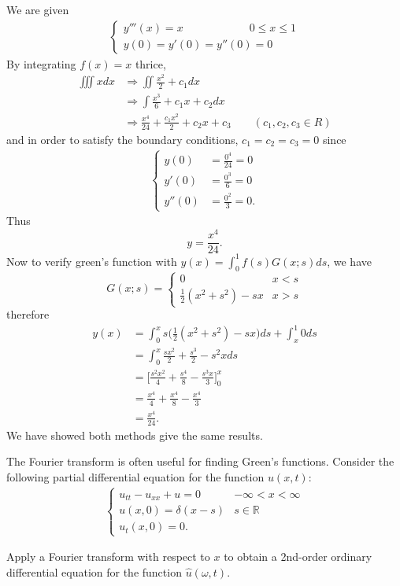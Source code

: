 \documentclass[12pt]{article}
\newcommand{\R}{\mathbb{R}}
\newcommand{\lra}{\Longrightarrow}
\newenvironment{problem}[2][Problem]{\begin{trivlist}
  \item[\hskip \labelsep {\bfseries #1}\hskip \labelsep {\bfseries #2:}]}{\end{trivlist}}
\newenvironment{subproblem}[2][Part]{\begin{trivlist}
  \item[\hskip \labelsep {\bfseries #1}\hskip \labelsep {\bfseries (#2)}]}{\end{trivlist}}
\newenvironment{solution}[1][Solution]{\begin{trivlist}
  \item[\hskip \labelsep {\bfseries #1} \hskip \labelsep]}{\end{trivlist}}
\theoremstyle{remark}
\begin{document}
\begin{solution}
  We are given
  \begin{align*}
    \left\{
      \begin{array}{ll}
        y'''(x) = x \qquad\qquad\qquad 0 \le x \le 1 \\
        y(0) = y'(0) = y''(0) = 0
      \end{array}
    \right.
  \end{align*}
  By integrating \(f(x) = x\) thrice,
  \begin{align*}
    \iiint x dx &\lra \iint \frac{x^2}{2} + c_1 dx \\
                &\lra \int \frac{x^3}{6} + c_1x + c_2 dx \\
                &\lra \frac{x^4}{24} + \frac{c_1x^2}{2} + c_2x + c_3
                  \qquad (c_1,c_2,c_3 \in R)
  \end{align*}
  and in order to satisfy the boundary conditions, \(c_1 = c_2 = c_3 = 0\) since
  \begin{align*}
    \left\{
      \begin{array}{ll}
        y(0) &= \frac{0^4}{24} = 0 \\
        y'(0) &= \frac{0^3}{6} = 0 \\
        y''(0) &= \frac{0^2}{3} = 0.    
      \end{array}
    \right.
  \end{align*}
  Thus
  \[
    y = \frac{x^4}{24}.
  \]
  Now to verify green's function with \(y(x) = \int_{0}^{1}f(s)G(x;s)ds\), we have
  \[
    G(x;s) =
    \left\{
    \begin{array}{ll}
      0 &x < s \\
      \frac{1}{2}(x^2+s^2) - sx &x > s
    \end{array}
    \right.
  \]
  therefore
  \begin{align*}
    y(x) &= \int_{0}^{x}s\big( \frac{1}{2}(x^2+s^2) - sx \big)ds + \int_{x}^{1}0ds \\
         &= \int_{0}^{x}\frac{sx^2}{2} + \frac{s^3}{2} - s^2x ds \\
         &= \bigg[\frac{s^2x^2}{4} + \frac{s^4}{8} - \frac{s^3x}{3} \bigg]_0^x \\
         &= \frac{x^4}{4} + \frac{x^4}{8} - \frac{x^4}{3} \\
         &= \frac{x^4}{24}.
  \end{align*}
  We have showed both methods give the same results.
\end{solution}
\clearpage
\begin{problem}{4}
  The Fourier transform is often useful for finding Green's functions. Consider the following
  partial differential equation for the function \(u(x,t)\):
  \begin{align*}
    \left\{
    \begin{array}{ll}
      u_{tt}-u_{xx} + u = 0 & -\infty < x < \infty \\
      u(x,0) = \delta(x-s) & s \in \R \\
      u_t(x,0) = 0.
    \end{array}
    \right.
  \end{align*}
\end{problem}
\begin{subproblem}{a}
  Apply a Fourier transform with respect to \(x\) to obtain a 2nd-order ordinary differential
  equation for the function \(\hat{u}(\omega,t)\).
\end{subproblem}
\end{document}

